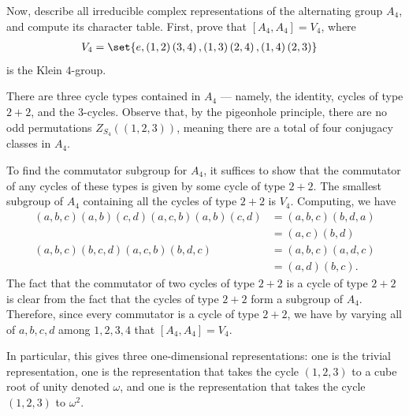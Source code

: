 \documentclass[10pt]{mypackage}
\begin{document}
\begin{problem}[Problem 4]
  Now, describe all irreducible complex representations of the alternating group $A_4$, and compute its character table. First, prove that $\left[ A_4,A_4 \right] = V_4$, where
  \begin{align*}
    V_4 &= \set{e,\left( 1,2 \right)\left( 3,4 \right),\left( 1,3 \right)\left( 2,4 \right),\left( 1,4 \right)\left( 2,3 \right)}
  \end{align*}
  is the Klein $4$-group.
\end{problem}
\begin{solution}
  There are three cycle types contained in $A_4$ --- namely, the identity, cycles of type $ 2 + 2 $, and the $3$-cycles. Observe that, by the pigeonhole principle, there are no odd permutations $Z_{S_4}\left( \left( 1,2,3 \right) \right)$, meaning there are a total of four conjugacy classes in $A_4$.

  To find the commutator subgroup for $A_4$, it suffices to show that the commutator of any cycles of these types is given by some cycle of type $2 + 2$. The smallest subgroup of $A_4$ containing all the cycles of type $2+2$ is $V_4$. Computing, we have
  \begin{align*}
    \left( a,b,c \right)\left( a,b \right)\left( c,d \right)\left( a,c,b \right)\left( a,b \right)\left( c,d \right) &= \left( a,b,c \right)\left( b,d,a \right)\\
                                                                                                                                &= \left( a,c \right)\left( b,d \right)\\
    \left( a,b,c \right)\left( b,c,d \right)\left( a,c,b \right)\left( b,d,c \right) &= \left( a,b,c \right)\left( a,d,c \right)\\
                                                                                     &= \left( a,d \right)\left( b,c \right).
  \end{align*}
  The fact that the commutator of two cycles of type $2 + 2$ is a cycle of type $2 + 2$ is clear from the fact that the cycles of type $2 + 2$ form a subgroup of $A_4$. Therefore, since every commutator is a cycle of type $ 2 + 2 $, we have by varying all of $a,b,c,d$ among $1,2,3,4$ that $\left[ A_4,A_4 \right] = V_4$.

  In particular, this gives three one-dimensional representations: one is the trivial representation, one is the representation that takes the cycle $\left( 1,2,3 \right)$ to a cube root of unity denoted $\omega$, and one is the representation that takes the cycle $\left( 1,2,3 \right)$ to $\omega^2$.


\end{solution}
\end{document}
